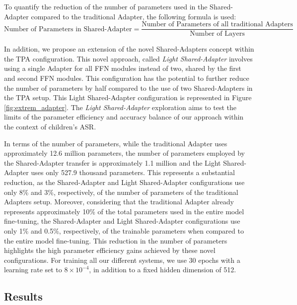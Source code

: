 To quantify the reduction of the number of parameters used in the Shared-Adapter compared to the traditional Adapter, the following formula is used:
\begin{equation}
    \text{Number of Parameters in Shared-Adapter} = \frac{\text{Number of Parameters of all traditional Adapters}}{\text{Number of Layers}}
\end{equation}

In addition, we propose an extension of the novel Shared-Adapters concept within the \ac{TPA} configuration. This novel approach, called \textit{Light Shared-Adapter} involves using a single Adapter for all \ac{FFN} modules instead of two, shared by the first and second \ac{FFN} modules. This configuration has the potential to further reduce the number of parameters by half compared to the use of two Shared-Adapters in the \ac{TPA} setup. This Light Shared-Adapter configuration is represented in Figure \ref{fig:extrem_adapter}. The \textit{Light Shared-Adapter} exploration aims to test the limits of the parameter efficiency and accuracy balance of our approach within the context of children's \ac{ASR}. 

In terms of the number of parameters, while the traditional Adapter uses approximately 12.6 million parameters, the number of parameters employed by the Shared-Adapter transfer is approximately 1.1 million and the Light Shared-Adapter uses only 527.9 thousand parameters. This represents a substantial reduction, as the Shared-Adapter and Light Shared-Adapter configurations use only 8\% and 3\%, respectively, of the number of parameters of the traditional Adapters setup. Moreover, considering that the traditional Adapter already represents approximately 10\% of the total parameters used in the entire model fine-tuning, the Shared-Adapter and Light Shared-Adapter configurations use only 1\% and 0.5\%, respectively, of the trainable parameters when compared to the entire model fine-tuning. This reduction in the number of parameters highlights the high parameter efficiency gains achieved by these novel configurations. For training all our different systems, we use 30 epochs with a learning rate set to $8 \times 10^{-4}$, in addition to a fixed hidden dimension of 512.

\subsection{Results}
